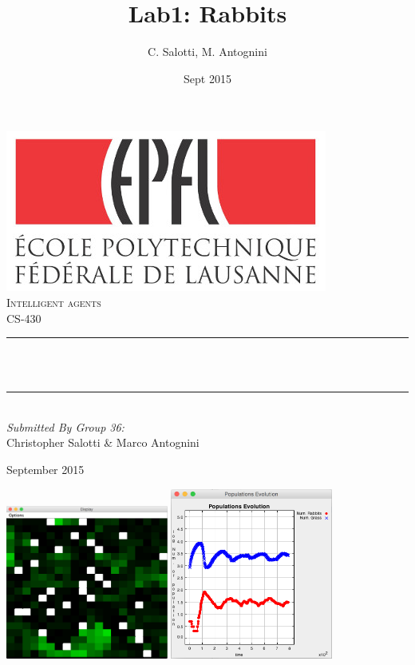 \documentclass[12pt]{article}
\title{Lab1: Rabbits} 				%
\author{C. Salotti, M. Antognini}	%
\date{Sept 2015}					%
\makeatletter
\let\thetitle\@title
\makeatother
\begin{document}

\begin{titlepage}
	\centering
    \vspace*{-2 cm}
    \includegraphics[scale = 0.75]{epfl.jpg}\\[1.0 cm]	%
    \textsc{\LARGE Intelligent agents}\\[1.0 cm]		%
	\textsc{\Large CS-430}\\[0.5 cm]					%
	\rule{\linewidth}{0.2 mm} \\[0.4 cm]
	{ \huge \bfseries \thetitle}\\
	\rule{\linewidth}{0.2 mm} \\[1 cm]
            
    \emph{Submitted By Group 36:} \\
    \Large{Christopher Salotti \& Marco Antognini}
    
	\vspace{0.5cm}
    September 2015
    \vspace{1em}
    
    \includegraphics[keepaspectratio=true, width=0.4\textwidth]{rabbits.png}
    \:
    \includegraphics[keepaspectratio=true, width=0.4\textwidth]{graph.png}
\end{titlepage}
\end{document}
